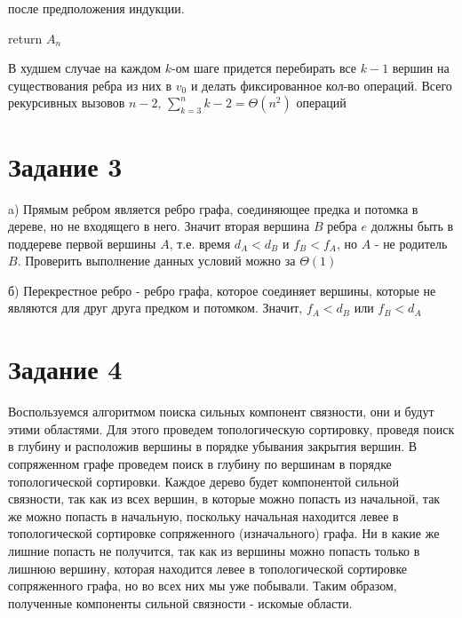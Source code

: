 \documentclass[a4paper,12pt]{article}
\begin{document}
\hspace{0.5cm} после предположения индукции.
	
\hspace{0.5cm}	return $A_{n}$
	
В худшем случае на каждом $k$-ом шаге придется перебирать все $k-1$ вершин на существования ребра из них в $v_{0}$ и делать фиксированное кол-во операций. Всего рекурсивных вызовов $n-2$, $\sum\limits^{n}_{k=3}{k-2}=\Theta(n^2)$ операций

\section*{Задание 3}
\hspace{0.5cm}
a) Прямым ребром является ребро графа, соединяющее предка и потомка в дереве, но не входящего в него. Значит вторая вершина $B$ ребра $e$ должны быть в поддереве первой вершины $A$, т.е. время $d_{A}<d_{B}$ и $f_{B}<f_{A}$, но $A$ - не родитель $B$. Проверить выполнение данных условий можно за $\Theta(1)$

б) Перекрестное ребро - ребро графа, которое соединяет вершины, которые не являются для друг друга предком и потомком. Значит, $f_{A}<d_{B}$ или $f_{B}<d_{A}$

\section*{Задание 4}
\hspace{0.5cm}
Воспользуемся алгоритмом поиска сильных компонент связности, они и будут этими областями. Для этого проведем топологическую сортировку, проведя поиск в глубину и расположив вершины в порядке убывания закрытия вершин. В сопряженном графе проведем поиск в глубину по вершинам в порядке топологической сортировки. Каждое дерево будет компонентой сильной связности, так как из всех вершин, в которые можно попасть из начальной, так же можно попасть в начальную, поскольку начальная находится левее в топологической сортировке сопряженного (изначального) графа. Ни в какие же лишние попасть не получится, так как из  вершины можно попасть только в лишнюю вершину, которая находится левее в топологической сортировке сопряженного графа, но во всех них мы уже побывали. Таким образом, полученные компоненты сильной связности - искомые области.
\end{document}
